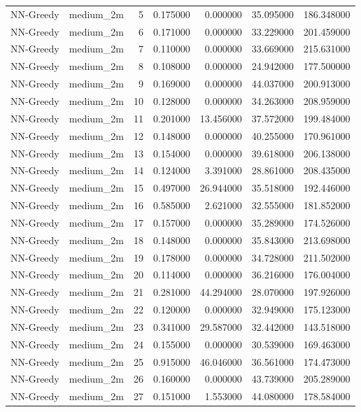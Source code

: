 \begin{tabular}{llrrrrr}
NN-Greedy & medium_2m & 5 & 0.175000 & 0.000000 & 35.095000 & 186.348000 \\
NN-Greedy & medium_2m & 6 & 0.171000 & 0.000000 & 33.229000 & 201.459000 \\
NN-Greedy & medium_2m & 7 & 0.110000 & 0.000000 & 33.669000 & 215.631000 \\
NN-Greedy & medium_2m & 8 & 0.108000 & 0.000000 & 24.942000 & 177.500000 \\
NN-Greedy & medium_2m & 9 & 0.169000 & 0.000000 & 44.037000 & 200.913000 \\
NN-Greedy & medium_2m & 10 & 0.128000 & 0.000000 & 34.263000 & 208.959000 \\
NN-Greedy & medium_2m & 11 & 0.201000 & 13.456000 & 37.572000 & 199.484000 \\
NN-Greedy & medium_2m & 12 & 0.148000 & 0.000000 & 40.255000 & 170.961000 \\
NN-Greedy & medium_2m & 13 & 0.154000 & 0.000000 & 39.618000 & 206.138000 \\
NN-Greedy & medium_2m & 14 & 0.124000 & 3.391000 & 28.861000 & 208.435000 \\
NN-Greedy & medium_2m & 15 & 0.497000 & 26.944000 & 35.518000 & 192.446000 \\
NN-Greedy & medium_2m & 16 & 0.585000 & 2.621000 & 32.555000 & 181.852000 \\
NN-Greedy & medium_2m & 17 & 0.157000 & 0.000000 & 35.289000 & 174.526000 \\
NN-Greedy & medium_2m & 18 & 0.148000 & 0.000000 & 35.843000 & 213.698000 \\
NN-Greedy & medium_2m & 19 & 0.178000 & 0.000000 & 34.728000 & 211.502000 \\
NN-Greedy & medium_2m & 20 & 0.114000 & 0.000000 & 36.216000 & 176.004000 \\
NN-Greedy & medium_2m & 21 & 0.281000 & 44.294000 & 28.070000 & 197.926000 \\
NN-Greedy & medium_2m & 22 & 0.120000 & 0.000000 & 32.949000 & 175.123000 \\
NN-Greedy & medium_2m & 23 & 0.341000 & 29.587000 & 32.442000 & 143.518000 \\
NN-Greedy & medium_2m & 24 & 0.155000 & 0.000000 & 30.539000 & 169.463000 \\
NN-Greedy & medium_2m & 25 & 0.915000 & 46.046000 & 36.561000 & 174.473000 \\
NN-Greedy & medium_2m & 26 & 0.160000 & 0.000000 & 43.739000 & 205.289000 \\
NN-Greedy & medium_2m & 27 & 0.151000 & 1.553000 & 44.080000 & 178.584000 \\

\end{tabular}
